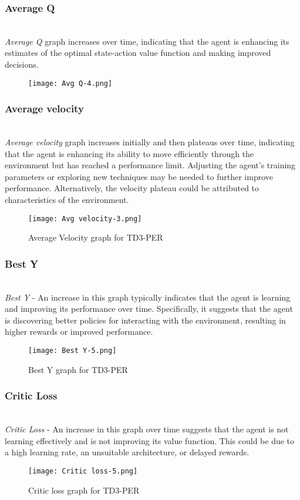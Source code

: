 \documentclass[preprint,12pt]{elsarticle}
\begin{document}
\subsubsection{Average Q}\\
\textit{Average Q} graph increases over time, indicating that the agent is enhancing its estimates of the optimal state-action value function and making improved decisions.
\graphicspath{ {./images/} }
\begin{figure}[!htbp]
  \centering
  \texttt{[image: Avg Q-4.png]}
  \label{fig:avg-q-4}
\end{figure}



\subsubsection{Average velocity}\\
\textit{Average velocity} graph increases initially and then plateaus over time, indicating that the agent is enhancing its ability to move efficiently through the environment but has reached a performance limit. Adjusting the agent's training parameters or exploring new techniques may be needed to further improve performance. Alternatively, the velocity plateau could be attributed to characteristics of the environment.
\graphicspath{ {./images/} }
\begin{figure}[!htbp]
  \centering
  \texttt{[image: Avg velocity-3.png]}
  \caption{Average Velocity graph for TD3-PER}
  \label{fig:avg-velocity-3}
\end{figure}


\subsubsection{Best Y}\\
\textit{Best Y} - An increase in this graph typically indicates that the agent is learning and improving its performance over time. Specifically, it suggests that the agent is discovering better policies for interacting with the environment, resulting in higher rewards or improved performance.
\graphicspath{ {./images/} }
\begin{figure}[!htbp]
  \centering
  \texttt{[image: Best Y-5.png]}
  \caption{Best Y graph for TD3-PER}
  \label{fig:best-y-5}
\end{figure}


\subsubsection{Critic Loss}\\
\textit{Critic Loss} - An increase in this graph over time suggests that the agent is not learning effectively and is not improving its value function. This could be due to a high learning rate, an unsuitable architecture, or delayed rewards.
\graphicspath{ {./images/} }
\begin{figure}[!htbp]
  \centering
  \texttt{[image: Critic loss-5.png]}
  \caption{Critic loss graph for TD3-PER}
  \label{fig:critic-loss-5}
\end{figure}
\end{document}
